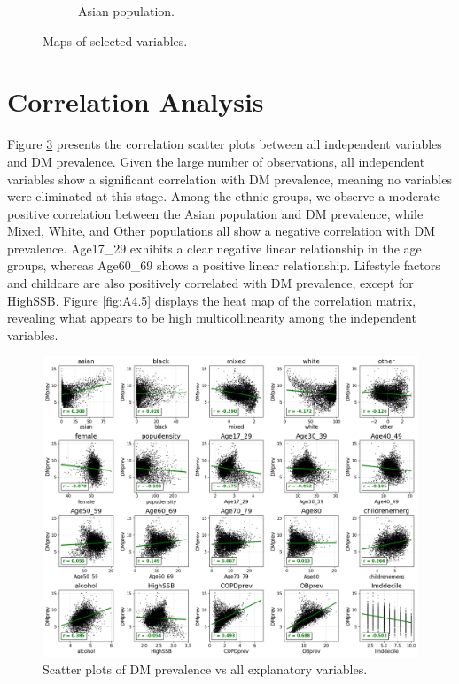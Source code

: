\begin{figure}[ht]
\begin{subfigure}{.4\textwidth}
  \caption{Asian population.}
  \label{fig:A4.34}
\end{subfigure}
\caption{Maps of selected variables.}
\label{fig:A4.3}
\end{figure}

\clearpage
\section{Correlation Analysis}
\label{chap:4.2}
Figure \ref{fig:A4.4} presents the correlation scatter plots between all independent variables and DM prevalence. Given the large number of observations, all independent variables show a significant correlation with DM prevalence, meaning no variables were eliminated at this stage. Among the ethnic groups, we observe a moderate positive correlation between the Asian population and DM prevalence, while Mixed, White, and Other populations all show a negative correlation with DM prevalence. Age17\_29 exhibits a clear negative linear relationship in the age groups, whereas Age60\_69 shows a positive linear relationship. Lifestyle factors and childcare are also positively correlated with DM prevalence, except for HighSSB. Figure \ref{fig:A4.5} displays the heat map of the correlation matrix, revealing what appears to be high multicollinearity among the independent variables.

\begin{figure}[ht]
  \centering
  \includegraphics[width=.99\linewidth]{ucl-latex-thesis-templates-master/Image/methods_corrscat_1.png}
  \caption{Scatter plots of DM prevalence vs all explanatory variables.}
  \label{fig:A4.4}
\end{figure}%

